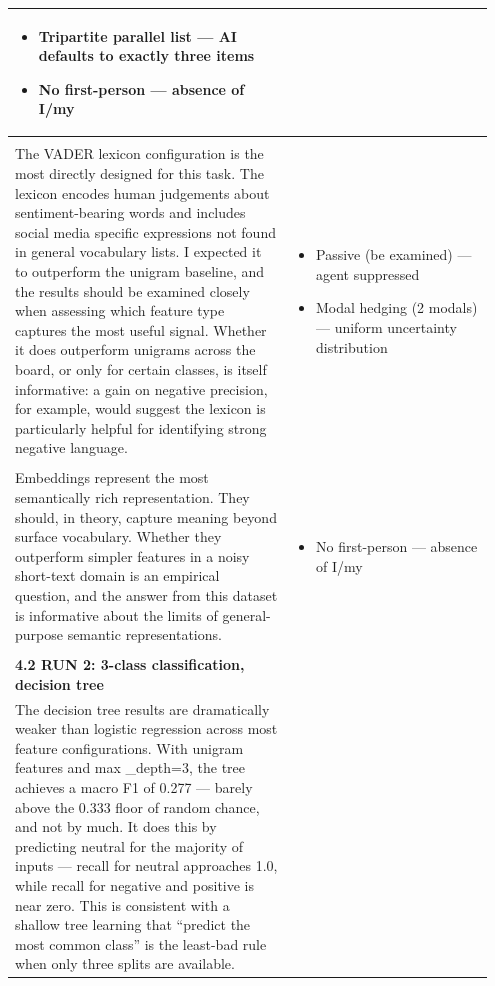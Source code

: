 \documentclass[11pt]{article}
\begin{document}
\begin{longtable}{|p{0.55\linewidth}|p{0.40\linewidth}|}
\begin{itemize}[leftmargin=1em,itemsep=1pt,topsep=1pt,parsep=0pt]
  \item Tripartite parallel list --- AI defaults to exactly three items
  \item No first-person --- absence of I/my
\end{itemize} \\[2pt]
\hline
\rule[-3.5cm]{0pt}{3.5cm} & \\
\hline
The VADER lexicon configuration is the most directly designed for this task. The lexicon encodes human judgements about sentiment-bearing words and includes social media specific expressions not found in general vocabulary lists. I expected it to outperform the unigram baseline, and the results should be examined closely when assessing which feature type captures the most useful signal. Whether it does outperform unigrams across the board, or only for certain classes, is itself informative: a gain on negative precision, for example, would suggest the lexicon is particularly helpful for identifying strong negative language. & \begin{itemize}[leftmargin=1em,itemsep=1pt,topsep=1pt,parsep=0pt]
  \item Passive (be examined) --- agent suppressed
  \item Modal hedging (2 modals) --- uniform uncertainty distribution
\end{itemize} \\[2pt]
\hline
\rule[-3.5cm]{0pt}{3.5cm} & \\
\hline
Embeddings represent the most semantically rich representation. They should, in theory, capture meaning beyond surface vocabulary. Whether they outperform simpler features in a noisy short-text domain is an empirical question, and the answer from this dataset is informative about the limits of general-purpose semantic representations. & \begin{itemize}[leftmargin=1em,itemsep=1pt,topsep=1pt,parsep=0pt]
  \item No first-person --- absence of I/my
\end{itemize} \\[2pt]
\hline
\rule[-3.5cm]{0pt}{3.5cm} & \\
\hline
\textbf{4.2 RUN 2: 3-class classification, decision tree}\\[4pt]
The decision tree results are dramatically weaker than logistic regression across most feature configurations. With unigram features and max \_depth=3, the tree achieves a macro F1 of 0.277 --- barely above the 0.333 floor of random chance, and not by much. It does this by predicting neutral for the majority of inputs --- recall for neutral approaches 1.0, while recall for negative and positive is near zero. This is consistent with a shallow tree learning that ``predict the most common class'' is the least-bad rule when only three splits are available. & \begin{itemize}[leftmargin=1em,itemsep=1pt,topsep=1pt,parsep=0pt]

\end{itemize}
\end{longtable}
\end{document}
